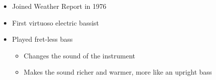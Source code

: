 \documentclass[]{article}
\providecommand{\tightlist}{%
  \setlength{\itemsep}{0pt}\setlength{\parskip}{0pt}}
\begin{document}
\begin{enumerate}
  \begin{itemize}
  \tightlist
  \item
    Joined Weather Report in 1976
  \item
    First virtuoso electric bassist
  \item
    Played fret-less bass

    \begin{itemize}
    \tightlist
    \item
      Changes the sound of the instrument
    \item
      Makes the sound richer and warmer, more like an upright bass
    \end{itemize}
  \end{itemize}
\end{enumerate}
\end{document}

